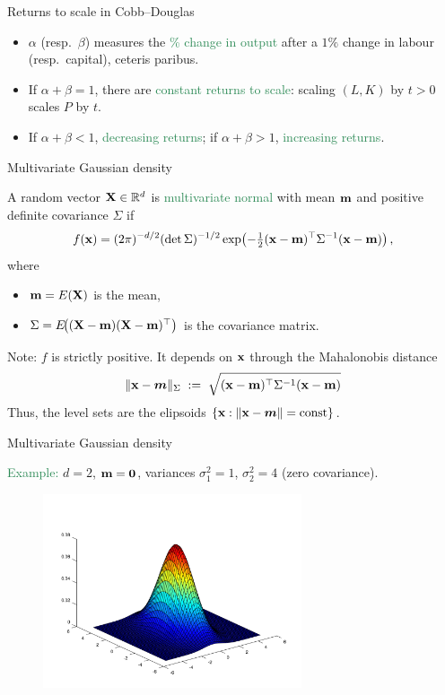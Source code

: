 \documentclass[11pt,aspectratio=169]{beamer}
\begin{document}
\begin{frame}{Returns to scale in Cobb--Douglas}

\begin{itemize}
\item \(\alpha\) (resp.\ \(\beta\)) measures the \textcolor{SeaGreen}{\% change in output} after a \(1\%\) change in labour (resp.\ capital), ceteris paribus.
\item If \(\alpha+\beta=1\), there are \textcolor{SeaGreen}{constant returns to scale}: scaling \((L,K)\) by \(t>0\) scales \(P\) by \(t\).
\item If \(\alpha+\beta<1\), \textcolor{SeaGreen}{decreasing returns}; if \(\alpha+\beta>1\), \textcolor{SeaGreen}{increasing returns}.
\end{itemize}

\end{frame}

\begin{frame}{Multivariate Gaussian density}

A random vector \({\bf X}\in\mathbb R^d\) is \textcolor{SeaGreen}{multivariate normal} with mean \({\bf m}\) and positive definite covariance \(\Sigma\) if
\[
f({\bf x})=(2\pi)^{-d/2}(\det \Sigma)^{-1/2}
\exp\!\left(-\tfrac12({\bf x}-{\bf m})^{\top}\Sigma^{-1}({\bf x}-{\bf m})\right),
\]
where 
\begin{itemize}
	\item \({\bf m}=E({\bf X})\) is the mean,
	\item \(\Sigma=E\!\big(({\bf X}-{\bf m})({\bf X}-{\bf m})^{\top}\big)\) is the covariance matrix.\\[4mm]
\end{itemize}
Note: $f$ is strictly positive. It depends on $\mathbf{x}$ through the Mahalonobis distance $$\|\mathbf{x}-\boldsymbol m\|_{\Sigma}\;:=\;\sqrt{({\bf x}-{\bf m})^{\top}\Sigma^{-1}({\bf x}-{\bf m})}$$
Thus, the level sets are the elipsoids $\{\mathbf{x}:\|\mathbf{x}-\boldsymbol m\|={\rm const}\}$.
\end{frame}

\begin{frame}{Multivariate Gaussian density}

\textcolor{SeaGreen}{Example:} \(d=2\), \({\bf m}={\bf 0}\), variances \(\sigma_1^2=1\), \(\sigma_2^2=4\) (zero covariance).

\begin{figure}
\includegraphics[width=3in]{img/multiv}
\end{figure}
\end{frame}
\end{document}
